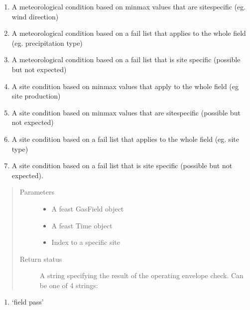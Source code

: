 \documentclass[letterpaper,10pt,english]{sphinxmanual}
\begin{document}
\begin{fulllineitems}
\begin{fulllineitems}
\begin{enumerate}
\item {} 
A meteorological condition based on min\sphinxhyphen{}max values that are site\sphinxhyphen{}specific (eg. wind direction)

\item {} 
A meteorological condition based on a fail list that applies to the whole field (eg. precipitation type)

\item {} 
A meteorological condition based on a fail list that is site specific (possible but not expected)

\item {} 
A site condition based on min\sphinxhyphen{}max values that apply to the whole field (eg site production)

\item {} 
A site condition based on min\sphinxhyphen{}max values that are site\sphinxhyphen{}specific (possible but not expected)

\item {} 
A site condition based on a fail list that applies to the whole field (eg. site type)

\item {} 
A site condition based on a fail list that is site specific (possible but not expected).

\end{enumerate}
\begin{quote}\begin{description}
\item[{Parameters}] \leavevmode\begin{itemize}
\item {} 
 \textendash{} A feast GasField object

\item {} 
 \textendash{} A feast Time object

\item {} 
 \textendash{} Index to a specific site

\end{itemize}

\item[{Return status}] \leavevmode
A string specifying the result of the operating envelope check. Can be one of 4 strings:

\end{description}\end{quote}
\begin{enumerate}
%
\item {} 
‘field pass’


\end{enumerate}
\end{fulllineitems}
\end{fulllineitems}
\end{document}
